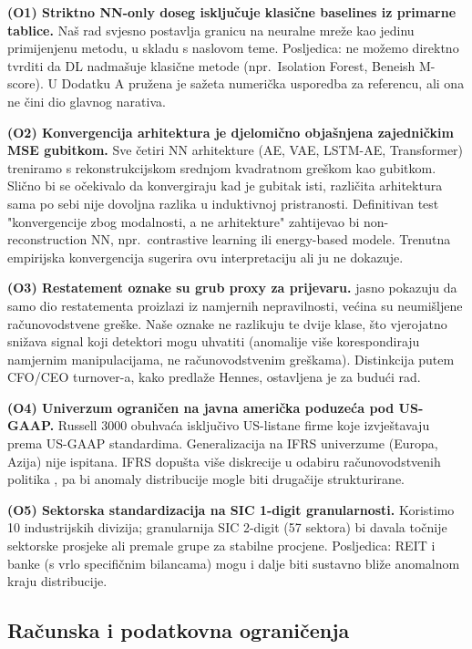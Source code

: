 \documentclass[diplomskirad,authoryear]{fer}
\begin{document}
\textbf{(O1) Striktno NN-only doseg isključuje klasične baselines iz primarne tablice.} Naš rad svjesno postavlja granicu na neuralne mreže kao jedinu primijenjenu metodu, u skladu s naslovom teme. Posljedica: ne možemo direktno tvrditi da DL nadmašuje klasične metode (npr.\ Isolation Forest, Beneish M-score). U Dodatku A pružena je sažeta numerička usporedba za referencu, ali ona ne čini dio glavnog narativa.

\textbf{(O2) Konvergencija arhitektura je djelomično objašnjena zajedničkim MSE gubitkom.} Sve četiri NN arhitekture (AE, VAE, LSTM-AE, Transformer) treniramo s rekonstrukcijskom srednjom kvadratnom greškom kao gubitkom. Slično bi se očekivalo da konvergiraju kad je gubitak isti, različita arhitektura sama po sebi nije dovoljna razlika u induktivnoj pristranosti. Definitivan test "konvergencije zbog modalnosti, a ne arhitekture" zahtijevao bi non-reconstruction NN, npr.\ contrastive learning ili energy-based modele. Trenutna empirijska konvergencija sugerira ovu interpretaciju ali ju ne dokazuje.

\textbf{(O3) Restatement oznake su grub proxy za prijevaru.} \citet{hennes2008} jasno pokazuju da samo dio restatementa proizlazi iz namjernih nepravilnosti, većina su neumišljene računovodstvene greške. Naše oznake ne razlikuju te dvije klase, što vjerojatno snižava signal koji detektori mogu uhvatiti (anomalije više korespondiraju namjernim manipulacijama, ne računovodstvenim greškama). Distinkcija putem CFO/CEO turnover-a, kako predlaže Hennes, ostavljena je za budući rad.

\textbf{(O4) Univerzum ograničen na javna američka poduzeća pod US-GAAP.} Russell 3000 obuhvaća isključivo US-listane firme koje izvještavaju prema US-GAAP standardima. Generalizacija na IFRS univerzume (Europa, Azija) nije ispitana. IFRS dopušta više diskrecije u odabiru računovodstvenih politika \citep{cecchini2010}, pa bi anomaly distribucije mogle biti drugačije strukturirane.

\textbf{(O5) Sektorska standardizacija na SIC 1-digit granularnosti.} Koristimo 10 industrijskih divizija; granularnija SIC 2-digit (57 sektora) bi davala točnije sektorske prosjeke ali premale grupe za stabilne procjene. Posljedica: REIT i banke (s vrlo specifičnim bilancama) mogu i dalje biti sustavno bliže anomalnom kraju distribucije.

\subsection{Računska i podatkovna ograničenja}
\end{document}
